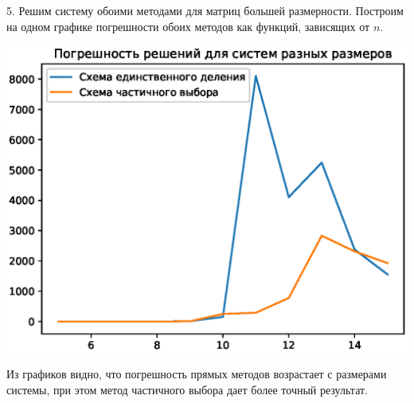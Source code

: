 5. Решим систему обоими методами для матриц большей размерности. Построим на одном графике погрешности обоих методов как функций, зависящих от $n$.

\includegraphics[width=15cm]{311.eps}

Из графиков видно, что погрешность прямых методов возрастает с размерами системы, при этом метод частичного выбора дает более точный результат.
